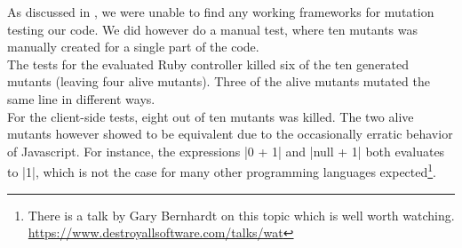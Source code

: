 \MakeShortVerb{\|}

As discussed in , we were unable to find any working
frameworks for mutation testing our code. We did however do a manual
test, where ten mutants was manually created for a single part of the
code.\\

The tests for the evaluated Ruby controller killed six of the ten
generated mutants (leaving four alive mutants). Three of the alive
mutants mutated the same line in different ways.\\

For the client-side tests, eight out of ten mutants was killed. The two
alive mutants however showed to be equivalent due to the occasionally
erratic behavior of Javascript. For instance, the expressions |0 + 1|
and |null + 1| both evaluates to |1|, which is not the case for many
other programming languages expected\footnote{There is a talk by Gary
Bernhardt on this topic which is well worth watching.
\url{https://www.destroyallsoftware.com/talks/wat}}.\\
